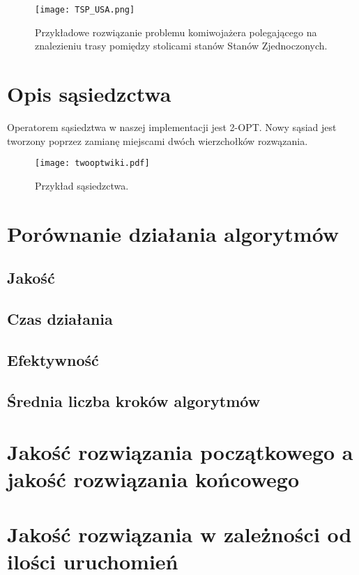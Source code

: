 \documentclass{article}
\begin{document}
\begin{figure} 
\begin{center}
\texttt{[image: TSP\_USA.png]}
\end{center}
\caption{Przykładowe rozwiązanie problemu komiwojażera polegającego na znalezieniu trasy pomiędzy stolicami stanów Stanów Zjednoczonych.}
\label{fig:schemat}
\end{figure}


\section{Opis sąsiedzctwa}

Operatorem sąsiedztwa w naszej implementacji jest 2-OPT. Nowy sąsiad jest tworzony poprzez zamianę miejscami dwóch wierzchołków rozwązania. 

\begin{figure} 
\begin{center}
\texttt{[image: twooptwiki.pdf]}
\end{center}
\caption{Przykład sąsiedzctwa.}
\label{fig:schemat}
\end{figure}


\section{Porównanie działania algorytmów}


\subsection{Jakość}
\subsection{Czas działania}
\subsection{Efektywność}
\subsection{Średnia liczba kroków algorytmów}


\section{Jakość rozwiązania początkowego a jakość rozwiązania końcowego}
\section{Jakość rozwiązania w zależności od ilości uruchomień}
\end{document}

